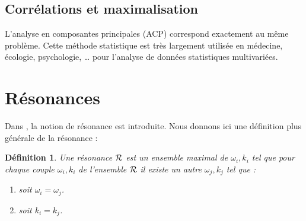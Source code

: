 \documentclass{book}
\newtheorem{defn}{D\'efinition}[chapter]
\begin{document}
\subsection{Corr\'elations et maximalisation}\label{sectionacp}

L'analyse en composantes 
principales (ACP) \cite{Jolliffe86}
correspond exactement au m\^eme  
probl\`eme. Cette m\'ethode statistique est tr\`es largement
utilis\'ee en m\'edecine, \'ecologie, psychologie, \dots
\cite{Jackson81,Aitchison83,Hotelling93} pour l'analyse de donn\'ees
statistiques multivari\'ees.


\section{R\'esonances}\label{reso}
Dans \cite{Aubry92}\cite{Aubry94}, la notion de
r\'esonance 
est introduite.
Nous donnons ici une d\'efinition plus g\'en\'erale de la r\'esonance :

\begin{defn}\label{defres}
Une r\'esonance ${\cal R}$ est un ensemble maximal de 
$\omega_i,k_i$ tel que pour
chaque couple $\omega_i,k_i$ de l'ensemble ${\cal R}$ 
il existe un autre
$\omega_j,k_j$ tel que :
\begin{enumerate}
\item soit $\omega_i=\omega_j$.
\item soit $k_i=k_j$.
\end{enumerate}
\end{defn}
\end{document}
